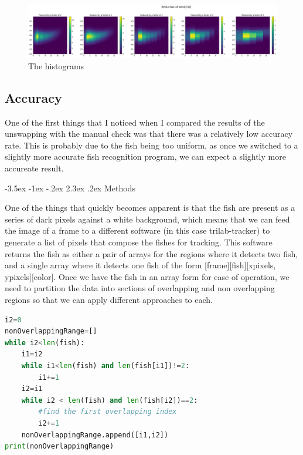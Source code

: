 \documentclass{article}
\makeatletter
\renewcommand\section{\clearpage\newpage\@startsection {section}{1}{\z@}%
	{-3.5ex \@plus -1ex \@minus -.2ex}%
	{2.3ex \@plus.2ex}%
	{\normalfont\Large\bfseries}}
\makeatother
\begin{document}
\begin{figure}[H]
	\centering
	\includegraphics[width=\linewidth]{reducedHist}
	\caption{The histograms}
	\label{fig:reducedHist}
\end{figure}

\subsection{Accuracy}

One of the first things that I noticed when I compared the results of the unswapping with the manual check was that there was a relatively low accuracy rate. This is probably due to the fish being too uniform, as once we switched to a slightly more accurate fish recognition program, we can expect a slightly more accureate result.

\section{Methods}

One of the things that quickly becomes apparent is that the fish are present as a series of dark pixels against a white background, which means that we can feed the image of a frame to a different software (in this case trilab-tracker) to generate a list of pixels that compose the fishes for tracking. This software returns the fish as either a pair of arrays for the regions where it detects two fish, and a single array where it detects one fish of the form [frame][fish][xpixels, ypixels][color]. Once we have the fish in an array form for ease of operation, we need to partition the data into sections of overlapping and non overlapping regions so that we can apply different approaches to each. 

\begin{minipage}[c]{\textwidth}
\begin{lstlisting}[language=Python]
i2=0
nonOverlappingRange=[]
while i2<len(fish):
    i1=i2
    while i1<len(fish) and len(fish[i1])!=2:
        i1+=1
    i2=i1
    while i2 < len(fish) and len(fish[i2])==2:
        #find the first overlapping index
        i2+=1
    nonOverlappingRange.append([i1,i2])
print(nonOverlappingRange)
\end{lstlisting}
\end{minipage}
\end{document}
